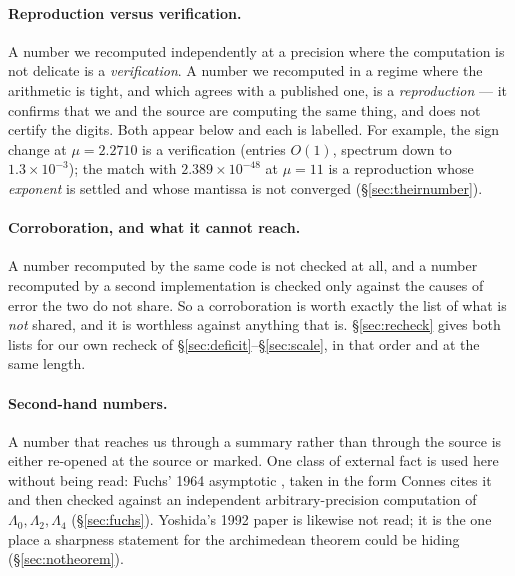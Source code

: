 \documentclass[11pt,a4paper]{article}
\theoremstyle{plain}
\theoremstyle{definition}
\theoremstyle{remark}
\begin{document}
\paragraph{Reproduction versus verification.}  A number we recomputed
independently at a precision where the computation is not delicate is a
\emph{verification}.  A number we recomputed in a regime where the arithmetic is
tight, and which agrees with a published one, is a \emph{reproduction} --- it
confirms that we and the source are computing the same thing, and does not
certify the digits.  Both appear below and each is labelled.  For example, the
sign change at $\mu=2.2710$ is a verification (entries $O(1)$, spectrum down to
$1.3\times10^{-3}$); the match with $2.389\times10^{-48}$ at $\mu=11$ is a
reproduction whose \emph{exponent} is settled and whose mantissa is not
converged (\S\ref{sec:theirnumber}).

\paragraph{Corroboration, and what it cannot reach.}  A number recomputed by the
same code is not checked at all, and a number recomputed by a second
implementation is checked only against the causes of error the two do not share.
So a corroboration is worth exactly the list of what is \emph{not} shared, and it
is worthless against anything that is.  \S\ref{sec:recheck} gives both lists for
our own recheck of \S\ref{sec:deficit}--\S\ref{sec:scale}, in that order and at
the same length.

\paragraph{Second-hand numbers.}  A number that reaches us through a summary
rather than through the source is either re-opened at the source or marked.  One
class of external fact is used here without being read: Fuchs' 1964 asymptotic
\cite{Fuchs1964}, taken in the form Connes cites it and then checked against an
independent arbitrary-precision computation of $\Lambda_0,\Lambda_2,\Lambda_4$
(\S\ref{sec:fuchs}).  Yoshida's 1992 paper \cite{Yoshida1992} is likewise not
read; it is the one place a sharpness statement for the archimedean theorem
could be hiding (\S\ref{sec:notheorem}).
\end{document}
